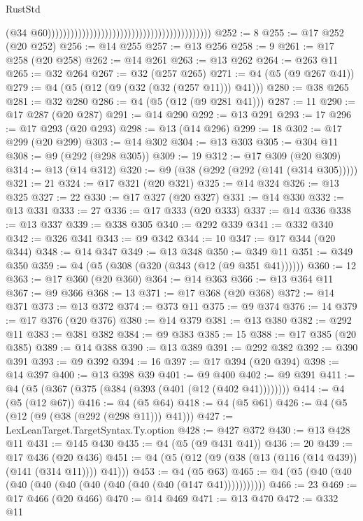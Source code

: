 \begin{lexlean}{RustStd}
\begin{coremodule}
                                                                                        (@34
                                                                                          @60)))))))))))))))))))))))))))))))))))))))))))
@252 := 8
@255 := @17 @252 (@20 @252)
@256 := @14 @255
@257 := @13 @256
@258 := 9
@261 := @17 @258 (@20 @258)
@262 := @14 @261
@263 := @13 @262
@264 := @263 @11
@265 := @32 @264
@267 := @32 (@257 @265)
@271 := @4 (@5 (@9 @267 @41))
@279 := @4 (@5 (@12 (@9 (@32 (@32 (@257 @11))) @41)))
@280 := @38 @265
@281 := @32 @280
@286 := @4 (@5 (@12 (@9 @281 @41)))
@287 := 11
@290 := @17 @287 (@20 @287)
@291 := @14 @290
@292 := @13 @291
@293 := 17
@296 := @17 @293 (@20 @293)
@298 := @13 (@14 @296)
@299 := 18
@302 := @17 @299 (@20 @299)
@303 := @14 @302
@304 := @13 @303
@305 := @304 @11
@308 := @9 (@292 (@298 @305))
@309 := 19
@312 := @17 @309 (@20 @309)
@314 := @13 (@14 @312)
@320 := @9 (@38 (@292 (@292 (@141 (@314 @305)))))
@321 := 21
@324 := @17 @321 (@20 @321)
@325 := @14 @324
@326 := @13 @325
@327 := 22
@330 := @17 @327 (@20 @327)
@331 := @14 @330
@332 := @13 @331
@333 := 27
@336 := @17 @333 (@20 @333)
@337 := @14 @336
@338 := @13 @337
@339 := @338 @305
@340 := @292 @339
@341 := @332 @340
@342 := @326 @341
@343 := @9 @342
@344 := 10
@347 := @17 @344 (@20 @344)
@348 := @14 @347
@349 := @13 @348
@350 := @349 @11
@351 := @349 @350
@359 := @4 (@5 (@308 (@320 (@343 (@12 (@9 @351 @41))))))
@360 := 12
@363 := @17 @360 (@20 @360)
@364 := @14 @363
@366 := @13 @364 @11
@367 := @9 @366
@368 := 13
@371 := @17 @368 (@20 @368)
@372 := @14 @371
@373 := @13 @372
@374 := @373 @11
@375 := @9 @374
@376 := 14
@379 := @17 @376 (@20 @376)
@380 := @14 @379
@381 := @13 @380
@382 := @292 @11
@383 := @381 @382
@384 := @9 @383
@385 := 15
@388 := @17 @385 (@20 @385)
@389 := @14 @388
@390 := @13 @389
@391 := @292 @382
@392 := @390 @391
@393 := @9 @392
@394 := 16
@397 := @17 @394 (@20 @394)
@398 := @14 @397
@400 := @13 @398 @39
@401 := @9 @400
@402 := @9 @391
@411 := @4 (@5 (@367 (@375 (@384 (@393 (@401 (@12 (@402 @41))))))))
@414 := @4 (@5 (@12 @67))
@416 := @4 (@5 @64)
@418 := @4 (@5 @61)
@426 := @4 (@5 (@12 (@9 (@38 (@292 (@298 @11))) @41)))
@427 := LexLeanTarget.TargetSyntax.Ty.option
@428 := @427 @372
@430 := @13 @428 @11
@431 := @145 @430
@435 := @4 (@5 (@9 @431 @41))
@436 := 20
@439 := @17 @436 (@20 @436)
@451 := @4 (@5 (@12 (@9 (@38 (@13 (@116 (@14 @439)) (@141 (@314 @11)))) @41)))
@453 := @4 (@5 @63)
@465 := @4 (@5 (@40 (@40 (@40 (@40 (@40 (@40 (@40 (@40 (@40 (@147 @41)))))))))))
@466 := 23
@469 := @17 @466 (@20 @466)
@470 := @14 @469
@471 := @13 @470
@472 := @332 @11

\end{coremodule}
\end{lexlean}
